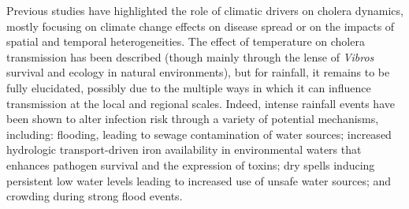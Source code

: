  Previous studies have highlighted the role of climatic drivers on cholera dynamics, mostly focusing on climate change effects on disease spread or on the impacts of spatial and temporal heterogeneities. The effect of temperature on cholera transmission has been described (though mainly through the lense of \textit{Vibros} survival and ecology in natural environments), but for rainfall, it remains to be fully elucidated, possibly due to the multiple ways in which it can influence transmission at the local and regional scales. Indeed, intense rainfall events have been shown to alter infection risk through a variety of potential mechanisms, including: flooding, leading to sewage contamination of water sources; increased hydrologic transport-driven iron availability in environmental waters that enhances pathogen survival and the expression of toxins; dry spells inducing persistent low water levels leading to increased use of unsafe water sources; and crowding during strong flood events.

